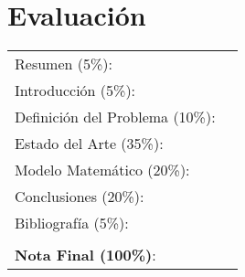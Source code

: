 \section*{Evaluación}

\begin{center}
    
    \begin{tabular}{ll}
    Resumen (5\%): & \underline{\hspace{2cm}} \\
    Introducción (5\%):  & \underline{\hspace{2cm}} \\
    Definición del Problema (10\%):  & \underline{\hspace{2cm}} \\
    Estado del Arte (35\%):  & \underline{\hspace{2cm}} \\
    Modelo Matemático (20\%): &  \underline{\hspace{2cm}}\\
    Conclusiones (20\%): &  \underline{\hspace{2cm}}\\
    Bibliografía (5\%): & \underline{\hspace{2cm}}\\
     &  \\
    \textbf{Nota Final (100\%)}:   & \underline{\hspace{2cm}}
    \end{tabular}

\end{center}

